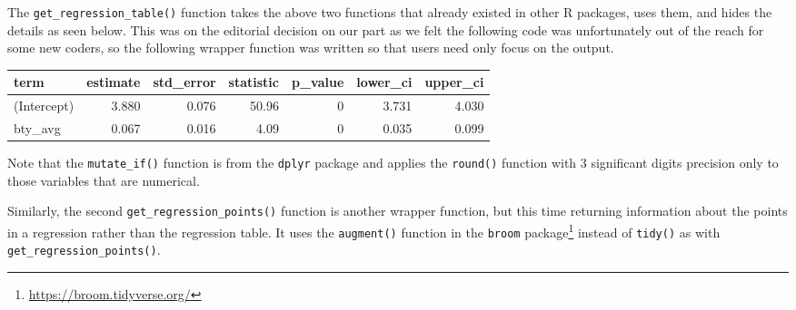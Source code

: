 \documentclass[12pt,]{krantz}
\makeatletter
\newenvironment{Shaded}{\begin{snugshade}}{\end{snugshade}}
\newcommand{\KeywordTok}[1]{\textcolor[rgb]{0.27,0.27,0.27}{\textbf{#1}}}
\newcommand{\DataTypeTok}[1]{\textcolor[rgb]{0.27,0.27,0.27}{#1}}
\newcommand{\DecValTok}[1]{\textcolor[rgb]{0.06,0.06,0.06}{#1}}
\newcommand{\StringTok}[1]{\textcolor[rgb]{0.5,0.5,0.5}{#1}}
\newcommand{\OtherTok}[1]{\textcolor[rgb]{0.37,0.37,0.37}{#1}}
\newcommand{\OperatorTok}[1]{\textcolor[rgb]{0.43,0.43,0.43}{\textbf{#1}}}
\newcommand{\NormalTok}[1]{#1}
\renewcommand{\href}[2]{#2\footnote{\url{#1}}}
\newenvironment{kframe}{%
\medskip{}
\setlength{\fboxsep}{.8em}
 \def\at@end@of@kframe{}%
 \ifinner\ifhmode%
  \def\at@end@of@kframe{\end{minipage}}%
  \begin{minipage}{\columnwidth}%
 \fi\fi%
 \def\FrameCommand##1{\hskip\@totalleftmargin \hskip-\fboxsep
 \colorbox{shadecolor}{##1}\hskip-\fboxsep
     \hskip-\linewidth \hskip-\@totalleftmargin \hskip\columnwidth}%
 \MakeFramed {\advance\hsize-\width
   \@totalleftmargin\z@ \linewidth\hsize
   \@setminipage}}%
 {\par\unskip\endMakeFramed%
 \at@end@of@kframe}
\renewenvironment{Shaded}{\begin{kframe}}{\end{kframe}}
\theoremstyle{definition}
\theoremstyle{definition}
\theoremstyle{definition}
\theoremstyle{remark}
\makeatother
\begin{document}
The \texttt{get\_regression\_table()} function takes the above two
functions that already existed in other R packages, uses them, and hides
the details as seen below. This was on the editorial decision on our
part as we felt the following code was unfortunately out of the reach
for some new coders, so the following wrapper function was written so
that users need only focus on the output.

\begin{Shaded}
\end{Shaded}

\begin{table}[H]
\centering\begingroup\fontsize{10}{12}\selectfont

\begin{tabular}{l|r|r|r|r|r|r}
\hline
term & estimate & std\_error & statistic & p\_value & lower\_ci & upper\_ci\\
\hline
(Intercept) & 3.880 & 0.076 & 50.96 & 0 & 3.731 & 4.030\\
\hline
bty\_avg & 0.067 & 0.016 & 4.09 & 0 & 0.035 & 0.099\\
\hline
\end{tabular}\endgroup{}
\end{table}

Note that the \texttt{mutate\_if()} function is from the \texttt{dplyr}
package and applies the \texttt{round()} function with 3 significant
digits precision only to those variables that are numerical.

Similarly, the second \texttt{get\_regression\_points()} function is
another wrapper function, but this time returning information about the
points in a regression rather than the regression table. It uses the
\texttt{augment()} function in the
\href{https://broom.tidyverse.org/}{\texttt{broom} package} instead of
\texttt{tidy()} as with \texttt{get\_regression\_points()}.
\end{document}
